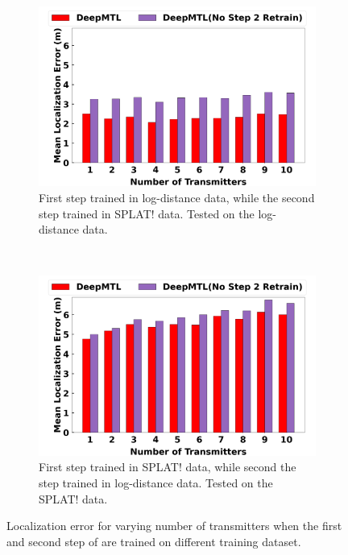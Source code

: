 \begin{figure}[t!]
    \centering
    \begin{subfigure}[t]{0.48\textwidth}
        \centering
        \includegraphics[width=\textwidth]{chapters/wowmom-pmc/figures/noretrain-logdistance-error-vary_numintru.png}
        \caption{First step trained in log-distance data, while the second step trained in SPLAT! data. Tested on the log-distance data.}
        \label{fig:notrain-logdist}
    \end{subfigure}%
    ~
    \begin{subfigure}[t]{0.48\textwidth}
        \centering
        \includegraphics[width=\textwidth]{chapters/wowmom-pmc/figures/noretrain-splat-error-vary_numintru.png}
        \caption{First step trained in SPLAT! data, while second the step trained in log-distance data. Tested on the SPLAT! data.}
        \label{fig:notrain-splat}
    \end{subfigure}
    \caption{Localization error for varying number of transmitters when the first and second step of \our are trained on different training dataset.}
    \label{fig:notrain}
\end{figure}

